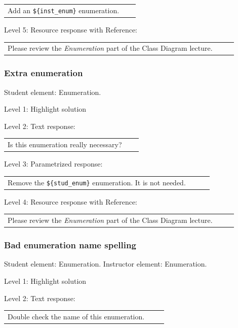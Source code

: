 \begin{tabular}{|p{0.9\linewidth}}
Add an \verb|${inst_enum}| enumeration.
\end{tabular} \medskip

\noindent Level 5: Resource response with Reference: \medskip

\begin{tabular}{|p{0.9\linewidth}}
Please review the \textit{Enumeration} part of the Class Diagram lecture.
\end{tabular} \medskip


\subsubsection{Extra enumeration}

Student element: Enumeration.  \medskip

\noindent Level 1: Highlight solution  \medskip

\noindent Level 2: Text response: \medskip

\begin{tabular}{|p{0.9\linewidth}}
Is this enumeration really necessary?
\end{tabular} \medskip

\noindent Level 3: Parametrized response: \medskip

\begin{tabular}{|p{0.9\linewidth}}
Remove the \verb|${stud_enum}| enumeration. It is not needed.
\end{tabular} \medskip

\noindent Level 4: Resource response with Reference: \medskip

\begin{tabular}{|p{0.9\linewidth}}
Please review the \textit{Enumeration} part of the Class Diagram lecture.
\end{tabular} \medskip


\subsubsection{Bad enumeration name spelling}

Student element: Enumeration. Instructor element: Enumeration. \medskip

\noindent Level 1: Highlight solution  \medskip

\noindent Level 2: Text response: \medskip

\begin{tabular}{|p{0.9\linewidth}}
Double check the name of this enumeration.
\end{tabular} \medskip

